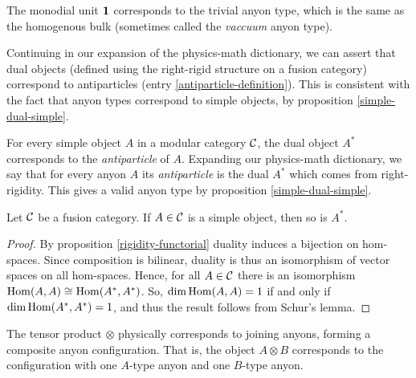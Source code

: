\begin{dict}\label{vacuum-anyon-definition} The monodial unit ${\mathbf 1} $ corresponds to the trivial anyon type, which is the same as the homogenous bulk (sometimes called the  {\em vaccuum} anyon type).
\end{dict}

\begin{rem} Continuing in our expansion of the physics-math dictionary, we can assert that dual objects (defined using the right-rigid structure on a fusion category) correspond to antiparticles (entry \ref{antiparticle-definition}). This is consistent with the fact that anyon types correspond to simple objects, by proposition \ref{simple-dual-simple}.
\end{rem}

\begin{dict}\label{antiparticle-definition}
For every simple object $A$ in a modular category ${\mathcal C}$, the dual object $A^*$ corresponds to the {\em antiparticle} of $A$.
Expanding our physics-math dictionary, we say that for every anyon $A$ its {\em antiparticle} is the dual $A^*$ which comes from right-rigidity. This gives a valid anyon type by proposition \ref{simple-dual-simple}.
\end{dict}

\begin{prop}\label{simple-dual-simple} Let ${\mathcal C}$ be a fusion category. If $A\in {\mathcal C}$ is a simple object, then so is $A^*$.
\end{prop}
\begin{proof} By proposition \ref{rigidity-functorial} duality induces a bijection on hom-spaces. Since composition is bilinear, duality is thus an isomorphism of vector spaces on all hom-spaces. Hence, for all $A\in {\mathcal C}$ there is an isomorphism $\operatorname{Hom}(A,A)\cong \operatorname{Hom}(A^*,A^*)$.  So, $\dim \operatorname{Hom}(A,A)= 1$ if and only if $\dim \operatorname{Hom}(A^*,A^*)=1$, and thus the result follows from Schur's lemma.
\end{proof}

\begin{dict}\label{composite-system-def}
The tensor product $\otimes$ physically corresponds to joining anyons, forming a composite anyon configuration. That is, the object $A\otimes B$ corresponds to the configuration with one $A$-type anyon and one $B$-type anyon.
\end{dict}

